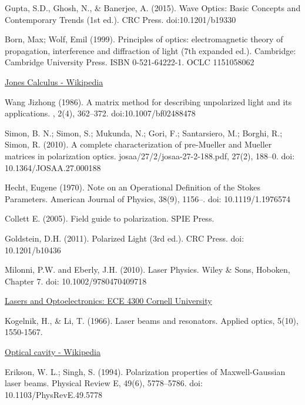 \documentclass[11pt,a4paper]{article}
\numberwithin{equation}{section}
\begin{document}
\begin{thebibliography}{999}
	Gupta, S.D., Ghosh, N., \& Banerjee, A. (2015). Wave Optics: Basic Concepts and Contemporary Trends (1st ed.). CRC Press. doi:10.1201/b19330
	
	Born, Max; Wolf, Emil (1999). Principles of optics: electromagnetic theory of propagation, interference and diffraction of light (7th expanded ed.). Cambridge: Cambridge University Press. ISBN 0-521-64222-1. OCLC 1151058062
	
	\href{https://en.wikipedia.org/wiki/Jones_calculus}{Jones Calculus - Wikipedia}
	
	Wang Jizhong (1986). A matrix method for describing unpolarized light and its applications. , 2(4), 362–372. doi:10.1007/bf02488478
	
     Simon, B. N.; Simon, S.; Mukunda, N.; Gori, F.; Santarsiero, M.; Borghi, R.; Simon, R. (2010). A complete characterization of pre-Mueller and Mueller matrices in polarization optics. josaa/27/2/josaa-27-2-188.pdf, 27(2), 188–0. doi: 10.1364/JOSAA.27.000188     
	
	Hecht, Eugene (1970). Note on an Operational Definition of the Stokes Parameters. American Journal of Physics, 38(9), 1156–. doi: 10.1119/1.1976574    
	
	Collett E. (2005). Field guide to polarization. SPIE Press.
	
	Goldstein, D.H. (2011). Polarized Light (3rd ed.). CRC Press. doi: 10.1201/b10436
	
	Milonni, P.W. and Eberly, J.H. (2010). Laser Physics. Wiley \& Sons, Hoboken, Chapter 7. doi: 10.1002/9780470409718
	
	\href{https://www.youtube.com/playlist?list=PLyWzPf87clvEb8T3Xf30tMaUqdbVchrNY}{Lasers and Optoelectronics: ECE 4300 Cornell University} 
	
	Kogelnik, H., \& Li, T. (1966). Laser beams and resonators. Applied optics, 5(10), 1550-1567. 
	
	\href{https://en.wikipedia.org/wiki/Optical_cavity}{Optical cavity - Wikipedia}
	
	Erikson, W. L.; Singh, S. (1994). Polarization properties of Maxwell-Gaussian laser beams. Physical Review E, 49(6), 5778–5786. doi: 10.1103/PhysRevE.49.5778
	

\end{thebibliography}
\end{document}
